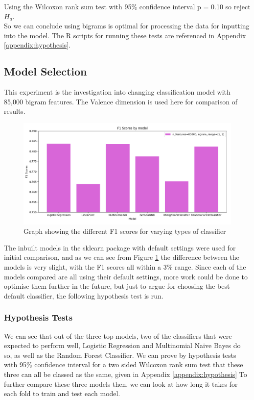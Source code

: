 Using the Wilcoxon rank sum test with 95\% confidence interval p = 0.10 so reject $H_a$.
\\ So we can conclude using bigrams is optimal for processing the data for inputting into the model.
The R scripts for running these tests are referenced in Appendix \ref{appendix:hypothesis}.

\subsection{Model Selection}

This experiment is the investigation into changing classification model with 85,000 bigram features. The Valence dimension is used here for comparison of results.

\begin{figure}[h]
\centering
\includegraphics[scale=0.5]{graphs/models.png}
\caption{Graph showing the different F1 scores for varying types of classifier}
\label{model:graph}
\end{figure}

The inbuilt models in the sklearn package with default settings were used for initial comparison, and as we can see from Figure \ref{model:graph} the difference between the models is very slight, with the F1 scores all within a 3\% range. Since each of the models compared are all using their default settings, more work could be done to optimise them further in the future, but just to argue for choosing the best default classifier, the following hypothesis test is run.

\subsubsection{Hypothesis Tests}

We can see that out of the three top models, two of the classifiers that were expected to perform well, Logistic Regression and Multinomial Naive Bayes do so, as well as the Random Forest Classifier. We can prove by hypothesis tests with 95\% confidence interval for a two sided Wilcoxon rank sum test that these three can all be classed as the same, given in Appendix \ref{appendix:hypothesis} To further compare these three models then, we can look at how long it takes for each fold to train and test each model.


